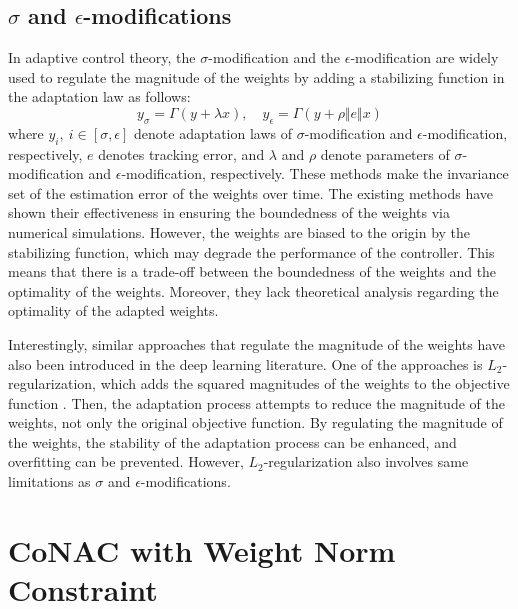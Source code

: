\subsection{
    \texorpdfstring{$\sigma$}{σ} and \texorpdfstring{$\epsilon$}{ε}-modifications
} 

In adaptive control theory, the $\sigma$-modification \cite{RN19} and the $\epsilon$-modification \cite{RN18, RN46} are widely used to regulate the magnitude of the weights by adding a stabilizing function in the adaptation law as follows:
\begin{equation}
    y_\sigma = \Gamma (y+\lambda x)
    ,
    \quad
    y_\epsilon = \Gamma (y+\rho\Vert e\Vert x)
\end{equation}
where $y_i,\ i\in[\sigma,\epsilon]$ denote adaptation laws of $\sigma$-modification and $\epsilon$-modification, respectively, $e$ denotes tracking error, and $\lambda$ and $\rho$ denote parameters of $\sigma$-modification and $\epsilon$-modification, respectively.
These methods make the invariance set of the estimation error of the weights over time.
The existing methods have shown their effectiveness in ensuring the boundedness of the weights via numerical simulations.
However, the weights are biased to the origin by the stabilizing function, which may degrade the performance of the controller.
This means that there is a trade-off between the boundedness of the weights and the optimality of the weights.
Moreover, they lack theoretical analysis regarding the optimality of the adapted weights.

Interestingly, similar approaches that regulate the magnitude of the weights have also been introduced in the deep learning literature.
One of the approaches is $L_2$-regularization, which adds the squared magnitudes of the weights to the objective function \cite{RN34, RN36}.
Then, the adaptation process attempts to reduce the magnitude of the weights, not only the original objective function.
By regulating the magnitude of the weights, the stability of the adaptation process can be enhanced, and overfitting can be prevented.
However, $L_2$-regularization also involves same limitations as $\sigma$ and $\epsilon$-modifications.

\section{CoNAC with Weight Norm Constraint} \label{chap3:problem} 

